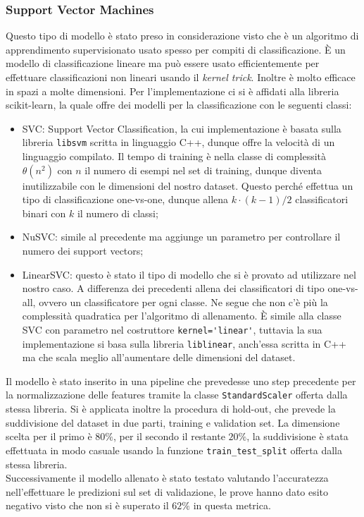 \subsubsection{Support Vector Machines}
Questo tipo di modello è stato preso in considerazione visto che è un algoritmo di apprendimento supervisionato usato spesso per compiti di classificazione. È un modello di classificazione lineare ma può essere usato efficientemente per effettuare classificazioni non lineari usando il \textit{kernel trick}. Inoltre è molto efficace in spazi a molte dimensioni.
Per l'implementazione ci si è affidati alla libreria scikit-learn, la quale offre dei modelli per la classificazione con le seguenti classi:
\begin{itemize}
    \item SVC: Support Vector Classification, la cui implementazione è basata sulla libreria \verb|libsvm| scritta in linguaggio C++, dunque offre la velocità di un linguaggio compilato. Il tempo di training è nella classe di complessità $\theta (n^2)$ con $n$ il numero di esempi nel set di training, dunque diventa inutilizzabile con le dimensioni del nostro dataset. Questo perché effettua un tipo di classificazione one-vs-one, dunque allena $k \cdot (k-1)/2$ classificatori binari con $k$ il numero di classi;
    \item NuSVC: simile al precedente ma aggiunge un parametro per controllare il numero dei support vectors;
    \item LinearSVC: questo è stato il tipo di modello che si è provato ad utilizzare nel nostro caso. A differenza dei precedenti allena dei classificatori di tipo one-vs-all, ovvero un classificatore per ogni classe. Ne segue che non c'è più la complessità quadratica per l'algoritmo di allenamento. È simile alla classe SVC con parametro nel costruttore \verb|kernel='linear'|, tuttavia la sua implementazione si basa sulla libreria \verb|liblinear|, anch'essa scritta in C++ ma che scala meglio all'aumentare delle dimensioni del dataset.
\end{itemize}
Il modello è stato inserito in una pipeline che prevedesse uno step precedente per la normalizzazione delle features tramite la classe \verb|StandardScaler| offerta dalla stessa libreria. Si è applicata inoltre la procedura di hold-out, che prevede la suddivisione del dataset in due parti, training e validation set. La dimensione scelta per il primo è $80\%$, per il secondo il restante $20\%$, la suddivisione è stata effettuata in modo casuale usando la funzione \verb|train_test_split| offerta dalla stessa libreria.\\
Successivamente il modello allenato è stato testato valutando l'accuratezza nell'effettuare le predizioni sul set di validazione, le prove hanno dato esito negativo visto che non si è superato il $62\%$ in questa metrica.

